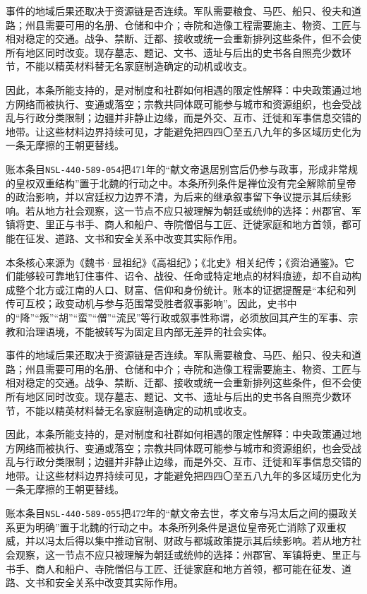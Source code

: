 事件的地域后果还取决于资源链是否连续。军队需要粮食、马匹、船只、役夫和道路；州县需要可用的名册、仓储和中介；寺院和造像工程需要施主、物资、工匠与相对稳定的交通。战争、禁断、迁都、接收或统一会重新排列这些条件，但不会使所有地区同时改变。现存墓志、题记、文书、遗址与后出的史书各自照亮少数环节，不能以精英材料替无名家庭制造确定的动机或收支。

因此，本条所能支持的，是对制度和社群如何相遇的限定性解释：中央政策通过地方网络而被执行、变通或落空；宗教共同体既可能参与城市和资源组织，也会受战乱与行政分类限制；边疆并非静止边缘，而是外交、互市、迁徙和军事信息交错的地带。让这些材料边界持续可见，才能避免把四四〇至五八九年的多区域历史化为一条无摩擦的王朝更替线。

账本条目\texttt{NSL-440-589-054}把471年的“献文帝退居别宫后仍参与政事，形成非常规的皇权双重结构”置于北魏的行动之中。本条所列条件是禅位没有完全解除前皇帝的政治影响，并以宫廷权力边界不清，为后来的继承叙事留下争议提示其后续影响。若从地方社会观察，这一节点不应只被理解为朝廷或统帅的选择：州郡官、军镇将吏、里正与书手、商人和船户、寺院僧侣与工匠、迁徙家庭和地方首领，都可能在征发、道路、文书和安全关系中改变其实际作用。

本条核心来源为《魏书·显祖纪》《高祖纪》；《北史》相关纪传；《资治通鉴》。它们能够较可靠地钉住事件、诏令、战役、任命或特定地点的材料痕迹，却不自动构成整个北方或江南的人口、财富、信仰和身份统计。账本的证据提醒是“本纪和列传可互校；政变动机与参与范围常受胜者叙事影响”。因此，史书中的“降”“叛”“胡”“蛮”“僧”“流民”等行政或叙事性称谓，必须放回其产生的军事、宗教和治理语境，不能被转写为固定且内部无差异的社会实体。

事件的地域后果还取决于资源链是否连续。军队需要粮食、马匹、船只、役夫和道路；州县需要可用的名册、仓储和中介；寺院和造像工程需要施主、物资、工匠与相对稳定的交通。战争、禁断、迁都、接收或统一会重新排列这些条件，但不会使所有地区同时改变。现存墓志、题记、文书、遗址与后出的史书各自照亮少数环节，不能以精英材料替无名家庭制造确定的动机或收支。

因此，本条所能支持的，是对制度和社群如何相遇的限定性解释：中央政策通过地方网络而被执行、变通或落空；宗教共同体既可能参与城市和资源组织，也会受战乱与行政分类限制；边疆并非静止边缘，而是外交、互市、迁徙和军事信息交错的地带。让这些材料边界持续可见，才能避免把四四〇至五八九年的多区域历史化为一条无摩擦的王朝更替线。

账本条目\texttt{NSL-440-589-055}把472年的“献文帝去世，孝文帝与冯太后之间的摄政关系更为明确”置于北魏的行动之中。本条所列条件是退位皇帝死亡消除了双重权威，并以冯太后得以集中推动官制、财政与都城政策提示其后续影响。若从地方社会观察，这一节点不应只被理解为朝廷或统帅的选择：州郡官、军镇将吏、里正与书手、商人和船户、寺院僧侣与工匠、迁徙家庭和地方首领，都可能在征发、道路、文书和安全关系中改变其实际作用。

